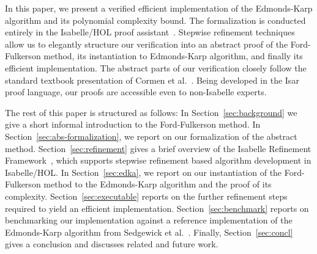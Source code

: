 \documentclass{llncs}
\begin{document}
In this paper, we present a verified efficient implementation of the Edmonds-Karp algorithm and its polynomial complexity bound.
The formalization is conducted entirely in the Isabelle/HOL proof assistant~\cite{NPW02}. 
Stepwise refinement techniques~\cite{Wirth71,Back78,BaWr98} allow us to elegantly structure our verification into an abstract proof of the Ford-Fulkerson method,
its instantiation to Edmonds-Karp algorithm, and finally its efficient implementation. The abstract parts of our verification closely follow the standard textbook presentation of Cormen et al.~\cite{CLRS09}. Being developed in the Isar~\cite{Wenzel99} proof language, our proofs are accessible even to non-Isabelle experts.

The rest of this paper is structured as follows: In Section~\ref{sec:background} we give a short informal introduction to the Ford-Fulkerson method.
In Section~\ref{sec:abs-formalization}, we report on our formalization of the abstract method. 
Section~\ref{sec:refinement} gives a brief overview of the Isabelle Refinement Framework~\cite{LaTu12,La12}, which supports stepwise refinement based algorithm development in Isabelle/HOL. In Section~\ref{sec:edka}, we report on our instantiation of the Ford-Fulkerson method to the Edmonds-Karp algorithm and the proof of its complexity.
Section~\ref{sec:executable} reports on the further refinement steps required to yield an efficient implementation. Section~\ref{sec:benchmark} reports on 
benchmarking our implementation against a reference implementation of the Edmonds-Karp algorithm from Sedgewick et al.~\cite{SeWa11}. 
Finally, Section~\ref{sec:concl} gives a conclusion and discusses related and future work.


\end{document}

